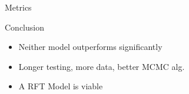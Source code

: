\documentclass[t,10pt,fleqn]{beamer}
\begin{document}


\begin{frame}{Metrics}
	\begin{block}{Conclusion}
		\begin{itemize}
			\item Neither model outperforms significantly \pause
			\item Longer testing, more data, better MCMC alg. \pause
			\item A RFT Model is viable
		\end{itemize}
	\end{block}
\end{frame}

\end{document}
